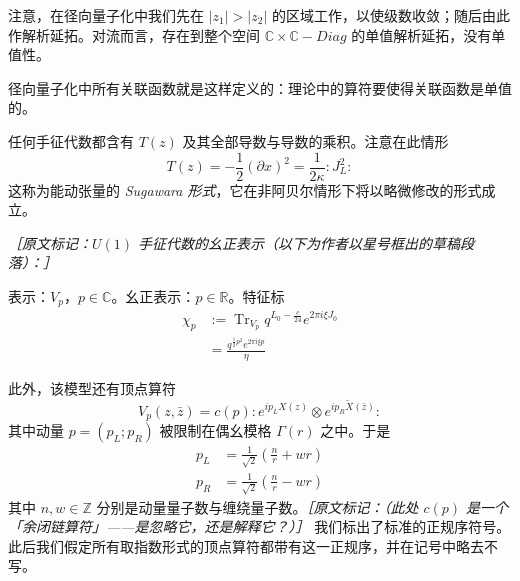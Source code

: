 注意，在径向量子化中我们先在 $|z_1|>|z_2|$ 的区域工作，以使级数收敛；随后由此作解析延拓。对流而言，存在到整个空间 $\mathbb{C}\times\mathbb{C}-\mathit{Diag}$ 的单值解析延拓，没有单值性。

径向量子化中所有关联函数就是这样定义的：理论中的算符要使得关联函数是单值的。

任何手征代数都含有 $T(z)$ 及其全部导数与导数的乘积。注意在此情形
\begin{equation}
  T(z)=-\frac12(\partial x)^2=\frac{1}{2\kappa}:J_L^2:
  \tag{2.316}
  \label{eq:2.316}
\end{equation}
这称为能动张量的 \emph{Sugawara 形式}，它在非阿贝尔情形下将以略微修改的形式成立。

{\small\itshape ［原文标记：$U(1)$ 手征代数的幺正表示（以下为作者以星号框出的草稿段落）：］}

表示：$V_p$，$p\in\mathbb{C}$。幺正表示：$p\in\mathbb{R}$。特征标
\begin{equation}
  \begin{aligned}
    \chi_p&:=\operatorname{Tr}_{V_p}q^{L_0-\frac{c}{24}}e^{2\pi i\xi J_0}\\
    &=\frac{q^{\frac12p^2}e^{2\pi i\xi p}}{\eta}
  \end{aligned}
  \tag{2.317}
  \label{eq:2.317}
\end{equation}

此外，该模型还有顶点算符
\begin{equation}
  V_p(z,\bar z)=c(p):e^{ip_LX(z)}\otimes e^{ip_R\tilde X(\bar z)}:
  \tag{2.318}
  \label{eq:2.318}
\end{equation}
其中动量 $p=(p_L;p_R)$ 被限制在偶幺模格 $\Gamma(r)$ 之中。于是
\begin{equation}
  \begin{aligned}
    p_L&=\frac{1}{\sqrt2}\left(\frac{n}{r}+wr\right)\\
    p_R&=\frac{1}{\sqrt2}\left(\frac{n}{r}-wr\right)
  \end{aligned}
  \tag{2.319}
  \label{eq:2.319}
\end{equation}
其中 $n,w\in\mathbb{Z}$ 分别是动量量子数与缠绕量子数。{\small\itshape ［原文标记：（此处 $c(p)$ 是一个「余闭链算符」——是忽略它，还是解释它？）］} 我们标出了标准的正规序符号。此后我们假定所有取指数形式的顶点算符都带有这一正规序，并在记号中略去不写。

